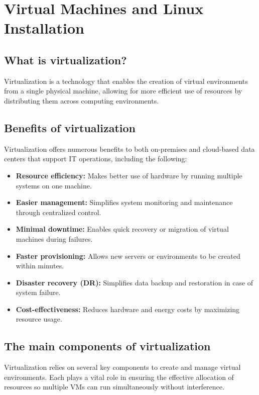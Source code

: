 \chapter{Virtual Machines and Linux Installation}

\section{What is virtualization?}
Virtualization is a technology that enables the creation of virtual environments from a single physical machine,
allowing for more efficient use of resources by distributing them across computing environments.

\section{Benefits of virtualization}
Virtualization offers numerous benefits to both on-premises and cloud-based data centers that support IT operations, including the following:

\begin{itemize}

    \item \textbf{Resource efficiency:} Makes better use of hardware by running multiple systems on one machine.

    \item \textbf{Easier management:} Simplifies system monitoring and maintenance through centralized control.

    \item \textbf{Minimal downtime:} Enables quick recovery or migration of virtual machines during failures.

    \item \textbf{Faster provisioning:} Allows new servers or environments to be created within minutes.

    \item \textbf{Disaster recovery (DR):} Simplifies data backup and restoration in case of system failure.

    \item \textbf{Cost-effectiveness:} Reduces hardware and energy costs by maximizing resource usage.

\end{itemize}

\section{The main components of virtualization}
Virtualization relies on several key components to create and manage virtual environments.
Each plays a vital role in ensuring the effective allocation of resources so multiple VMs can run simultaneously without interference.

